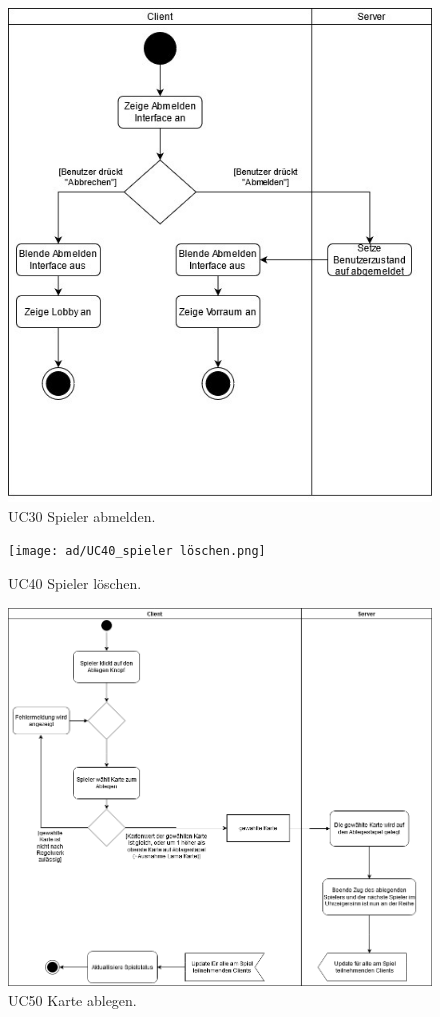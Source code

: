 \begin{figure}[h]
	\centering
	\includegraphics[width=\textwidth]{ad/UC30_Spieler_abmelden.jpeg}
	\caption{UC30 Spieler abmelden.}
\end{figure}

\begin{figure}[h]
	\centering
    \texttt{[image: ad/UC40\_spieler löschen.png]}
	\caption{UC40 Spieler löschen.}
\end{figure}

\begin{figure}[h]
	\centering
	\includegraphics[width=\textwidth]{ad/UC50_Ablegen.png}
	\caption{UC50 Karte ablegen.}
\end{figure}

